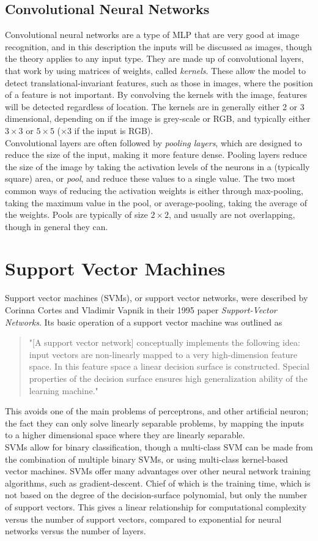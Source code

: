 \documentclass[12pt,a4paper,titlepage]{book}
\begin{document}
\subsection{Convolutional Neural Networks}
	Convolutional neural networks are a type of MLP that are very good at image recognition, and in this description the inputs will be discussed as images, though the theory applies to any input type. They are made up of convolutional layers, that work by using matrices of weights, called \textit{kernels}. These allow the model to detect translational-invariant features, such as those in images, where the position of a feature is not important. By convolving the kernels with the image, features will be detected regardless of location. The kernels are in generally either 2 or 3 dimensional, depending on if the image is grey-scale or RGB, and typically either $3\times3$ or $5\times5$ ($\times3$ if the input is RGB)\cite{cnn-analysis}.\\
	Convolutional layers are often followed by \textit{pooling layers}, which are designed to reduce the size of the input, making it more feature dense. Pooling layers reduce the size of the image by taking the activation levels of the neurons in a (typically square) area, or \textit{pool}, and reduce these values to a single value. The two most common ways of reducing the activation weights is either through max-pooling, taking the maximum value in the pool, or average-pooling, taking the average of the weights\cite{cnn-analysis}. Pools are typically of size $2\times2$, and usually are not overlapping, though in general they can.
\section{Support Vector Machines}
	Support vector machines (SVMs), or support vector networks, were described by Corinna Cortes and Vladimir Vapnik in their 1995 paper \textit{Support-Vector Networks}\cite{support-vector-machines}. Its basic operation of a support vector machine was outlined as 
\begin{quote}
 	"[A support vector network] conceptually implements the following idea: input vectors are non-linearly mapped to a very high-dimension feature space. In this feature space a linear decision surface is constructed. Special properties of the decision surface ensures high generalization ability of the learning  machine."
\end{quote}
	This avoids one of the main problems of perceptrons, and other artificial neuron; the fact they can only solve linearly separable problems, by mapping the inputs to a higher dimensional space where they are linearly separable.\\
	SVMs allow for binary classification, though a multi-class SVM can be made from the combination of multiple binary SVMs, or using multi-class kernel-based vector machines\cite{multiclass-svm}. SVMs offer many advantages over other neural network training algorithms, such as gradient-descent. Chief of which is the training time, which is not based on the degree of the decision-surface polynomial, but only the number of support vectors. This gives a linear relationship for computational complexity versus the number of support vectors, compared to exponential for neural networks versus the number of layers.
\end{document}
